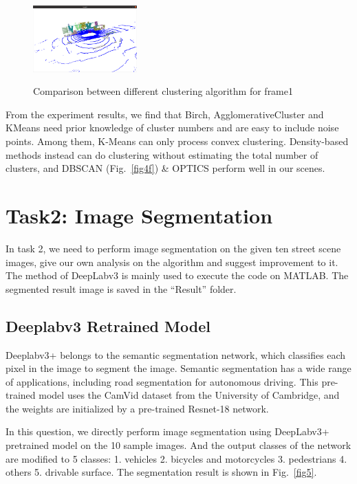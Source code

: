 \documentclass[10pt]{article}
\theoremstyle{nonumberplain}
\begin{document}
\begin{figure}[H]
\begin{minipage}[t]{0.3\textwidth}
		\label{fig4e}
	\end{minipage}
	\begin{minipage}[t]{0.3\textwidth}
		\centering
		\includegraphics[width=4cm]{fig3c.png}
		\label{fig4f}
	\end{minipage}
	\caption{Comparison between different clustering algorithm for frame1}
	\label{fig4}
\end{figure} 


From the experiment results, we find that Birch, AgglomerativeCluster and KMeans need prior knowledge of cluster numbers and are easy to include noise points. Among them, K-Means can only process convex clustering. Density-based methods instead can do clustering without estimating the total number of clusters, and DBSCAN (Fig.~\ref{fig4f}) \& OPTICS perform well in our scenes. 


\section{Task2: Image Segmentation}

\hspace{1.0em}
In task 2, we need to perform image segmentation on the given ten street scene images, give our own analysis on the algorithm and suggest improvement to it. The method of DeepLabv3 is mainly used to execute the code on MATLAB. The segmented result image is saved in the “Result” folder.

\subsection{Deeplabv3 Retrained Model}

\hspace{1.0em}
Deeplabv3+ belongs to the semantic segmentation network, which classifies each pixel in the image to segment the image. Semantic segmentation has a wide range of applications, including road segmentation for autonomous driving. This pre-trained model uses the CamVid dataset from the University of Cambridge, and the weights are initialized by a pre-trained Resnet-18 network.

In this question, we directly perform image segmentation using DeepLabv3+ pretrained model on the 10 sample images. And the output classes of the network are modified to 5 classes: 1. vehicles 2. bicycles and motorcycles 3. pedestrians 4. others 5. drivable surface. The segmentation result is shown in Fig.~\ref{fig5}. 
\end{document}
